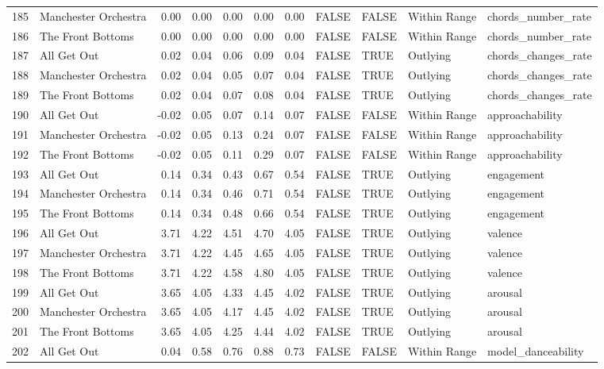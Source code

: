 \begin{table}[ht]
\begin{tabular}{rlrrrrrllll}
  185 & Manchester Orchestra & 0.00 & 0.00 & 0.00 & 0.00 & 0.00 & FALSE & FALSE & Within Range & chords\_number\_rate \\ 
  186 & The Front Bottoms & 0.00 & 0.00 & 0.00 & 0.00 & 0.00 & FALSE & FALSE & Within Range & chords\_number\_rate \\ 
  187 & All Get Out & 0.02 & 0.04 & 0.06 & 0.09 & 0.04 & FALSE & TRUE & Outlying & chords\_changes\_rate \\ 
  188 & Manchester Orchestra & 0.02 & 0.04 & 0.05 & 0.07 & 0.04 & FALSE & TRUE & Outlying & chords\_changes\_rate \\ 
  189 & The Front Bottoms & 0.02 & 0.04 & 0.07 & 0.08 & 0.04 & FALSE & TRUE & Outlying & chords\_changes\_rate \\ 
  190 & All Get Out & -0.02 & 0.05 & 0.07 & 0.14 & 0.07 & FALSE & FALSE & Within Range & approachability \\ 
  191 & Manchester Orchestra & -0.02 & 0.05 & 0.13 & 0.24 & 0.07 & FALSE & FALSE & Within Range & approachability \\ 
  192 & The Front Bottoms & -0.02 & 0.05 & 0.11 & 0.29 & 0.07 & FALSE & FALSE & Within Range & approachability \\ 
  193 & All Get Out & 0.14 & 0.34 & 0.43 & 0.67 & 0.54 & FALSE & TRUE & Outlying & engagement \\ 
  194 & Manchester Orchestra & 0.14 & 0.34 & 0.46 & 0.71 & 0.54 & FALSE & TRUE & Outlying & engagement \\ 
  195 & The Front Bottoms & 0.14 & 0.34 & 0.48 & 0.66 & 0.54 & FALSE & TRUE & Outlying & engagement \\ 
  196 & All Get Out & 3.71 & 4.22 & 4.51 & 4.70 & 4.05 & FALSE & TRUE & Outlying & valence \\ 
  197 & Manchester Orchestra & 3.71 & 4.22 & 4.45 & 4.65 & 4.05 & FALSE & TRUE & Outlying & valence \\ 
  198 & The Front Bottoms & 3.71 & 4.22 & 4.58 & 4.80 & 4.05 & FALSE & TRUE & Outlying & valence \\ 
  199 & All Get Out & 3.65 & 4.05 & 4.33 & 4.45 & 4.02 & FALSE & TRUE & Outlying & arousal \\ 
  200 & Manchester Orchestra & 3.65 & 4.05 & 4.17 & 4.45 & 4.02 & FALSE & TRUE & Outlying & arousal \\ 
  201 & The Front Bottoms & 3.65 & 4.05 & 4.25 & 4.44 & 4.02 & FALSE & TRUE & Outlying & arousal \\ 
  202 & All Get Out & 0.04 & 0.58 & 0.76 & 0.88 & 0.73 & FALSE & FALSE & Within Range & model\_danceability \\ 

\end{tabular}
\end{table}
